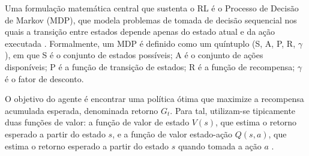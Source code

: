 Uma formulação matemática central que sustenta o \ac{RL} é o Processo de Decisão de Markov (\ac{MDP}), que modela problemas de tomada de decisão sequencial nos quais a transição entre estados depende apenas do estado atual e da ação executada \cite{li2022xrl}. Formalmente, um \ac{MDP} é definido como um quíntuplo (S, A, P, R, $\gamma$), em que S é o conjunto de estados possíveis; A é o conjunto de ações disponíveis; P é a função de transição de estados; R é a função de recompensa; $\gamma$ é o fator de desconto.

O objetivo do agente é encontrar uma política ótima que maximize a recompensa acumulada esperada, denominada retorno $G_t$. Para tal, utilizam-se tipicamente duas funções de valor: a função de valor de estado $V(s)$, que estima o retorno esperado a partir do estado $s$, e a função de valor estado-ação $Q(s,a)$, que estima o retorno esperado a partir do estado $s$ quando tomada a ação $a$ \cite{ghasemi2024comprehensive}.






